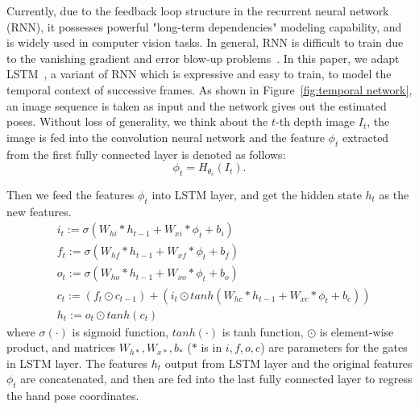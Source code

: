 \documentclass[journal,comsoc]{IEEEtran}
\def \J{\bm{\mathit{J}}}
\def \H{\mathit{H}}
\begin{document}
Currently, due to the feedback loop structure in the recurrent neural network (RNN), it possesses powerful "long-term dependencies"
modeling capability, and is widely used in computer vision tasks. In general, RNN is difficult to train due to the vanishing
gradient and error blow-up problems~\cite{kawakami2008supervised}. In this paper, we adapt LSTM~\cite{hochreiter1997long,zaremba2014learning},
a variant of RNN which is expressive and easy to train, to model the temporal context of successive frames.
As shown in Figure~\ref{fig:temporal network}, an image sequence is taken as input and the network gives out the estimated poses.
Without loss of generality, we think about the $t$-th depth image $I_t$,
the image is fed into the convolution neural network and the feature $\phi_t$ extracted from the first fully connected layer is denoted as follows:
\begin{equation}
\phi_t=\H_{\theta_c}(I_t).
\end{equation}

Then we feed the features $\phi_t$ into LSTM layer, and get the hidden state $h_t$ as the new features.
\begin{equation}
\begin{aligned}
&i_t := \sigma(W_{hi} * h_{t-1} + W_{xi} * \phi_t + b_i) \\
&f_t := \sigma(W_{hf} * h_{t-1} + W_{xf} * \phi_t + b_f) \\
&o_t := \sigma(W_{ho} * h_{t-1} + W_{xo} * \phi_t + b_o) \\
&c_t := (f_t \odot c_{t-1}) + (i_t \odot tanh(W_{hc} * h_{t-1} + W_{xc} * \phi_t + b_c)) \\
&h_t := o_t \odot tanh(c_t)
\end{aligned}
\end{equation}
where $\sigma(\cdot)$ is sigmoid function, $tanh(\cdot)$ is tanh function, $\odot$ is element-wise product, and matrices
$W_{h*}, W_{x*}, b_{*}$ ($*$ is in $i, f, o, c$) are parameters for the gates in LSTM layer.
The features $h_t$ output from LSTM layer and the original features $\phi_t$ are concatenated,
and then are fed into the last fully connected layer to regress the hand pose coordinates.\vspace{0.5em}
\end{document}
